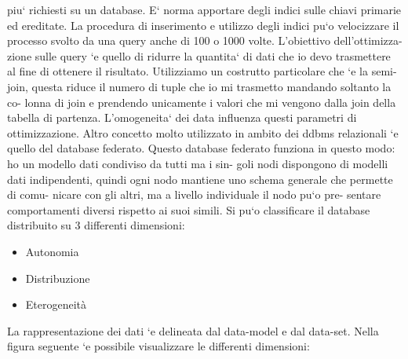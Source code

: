 piu` richiesti su un database. E` norma apportare degli indici sulle chiavi primarie ed ereditate. La procedura di inserimento e utilizzo degli indici pu`o velocizzare il processo svolto da una query anche di 100 o 1000 volte. L’obiettivo dell’ottimizza- zione sulle query `e quello di ridurre la quantita` di dati che io devo trasmettere al fine di ottenere il risultato. Utilizziamo un costrutto particolare che `e la semi-join, questa riduce il numero di tuple che io mi trasmetto mandando soltanto la co- lonna di join e prendendo unicamente i valori che mi vengono dalla join della tabella di partenza. L’omogeneita` dei data influenza questi parametri di ottimizzazione. Altro concetto molto utilizzato in ambito dei ddbms relazionali `e quello del database federato. Questo database federato funziona in questo modo: ho un modello dati condiviso da tutti ma i sin- goli nodi dispongono di modelli dati indipendenti, quindi ogni nodo mantiene uno schema generale che permette di comu- nicare con gli altri, ma a livello individuale il nodo pu`o pre- sentare comportamenti diversi rispetto ai suoi simili. Si pu`o classificare il database distribuito su 3 differenti dimensioni:

\begin{itemize}
    \item Autonomia
    \item Distribuzione
    \item Eterogeneità
\end{itemize}

La rappresentazione dei dati `e delineata dal data-model e dal data-set. Nella figura seguente `e possibile visualizzare le differenti dimensioni:

